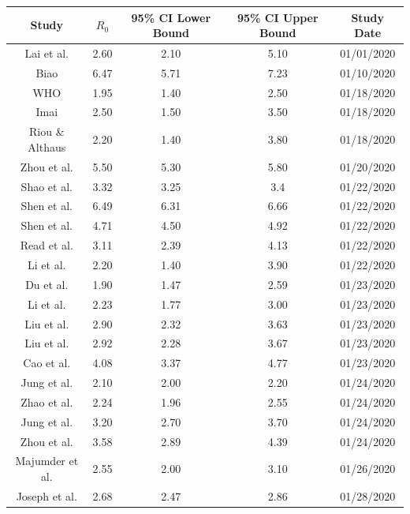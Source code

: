 \documentclass{article}
\begin{document}
\begin{center}
\begin{tabular}{|c|c|c|c|c|} 
\hline
Study & $R_0$ & 95\% CI Lower Bound & 95\% CI Upper Bound & Study Date\\ \hline
Lai et al. \cite{Lai} & 2.60 & 2.10 & 5.10 & 01/01/2020 \\ \hline
Biao \cite{Biao} & 6.47 & 5.71 & 7.23 & 01/10/2020 \\ \hline
WHO \cite{WHO} & 1.95 & 1.40 & 2.50 & 01/18/2020 \\ \hline
Imai \cite{Imai} & 2.50 & 1.50 & 3.50 & 01/18/2020 \\ \hline
Riou \& Althaus \cite{Riou} & 2.20 & 1.40 & 3.80 & 01/18/2020 \\ \hline
Zhou et al. \cite{Zhou2} & 5.50 & 5.30 & 5.80 & 01/20/2020 \\ \hline
Shao et al. \cite{Shao} & 3.32 & 3.25 & 3.4 & 01/22/2020 \\ \hline
Shen et al. \cite{Shen} & 6.49 & 6.31 & 6.66 & 01/22/2020 \\ \hline
Shen et al. \cite{Shen} & 4.71 & 4.50 & 4.92 & 01/22/2020 \\ \hline
Read et al. \cite{Read} & 3.11 & 2.39 & 4.13 & 01/22/2020 \\ \hline
Li et al. \cite{Li} & 2.20 & 1.40 & 3.90 & 01/22/2020 \\ \hline
Du et al. \cite{Du} & 1.90 & 1.47 & 2.59 & 01/23/2020 \\ \hline
Li et al. \cite{Li2} & 2.23 & 1.77 & 3.00 & 01/23/2020 \\ \hline
Liu et al. \cite{Liu} & 2.90 & 2.32 & 3.63 & 01/23/2020 \\ \hline
Liu et al. \cite{Liu} & 2.92 & 2.28 & 3.67 & 01/23/2020 \\ \hline
Cao et al. \cite{Cao} & 4.08 & 3.37 & 4.77 & 01/23/2020 \\ \hline
Jung et al. \cite{Jung} & 2.10 & 2.00 & 2.20 & 01/24/2020 \\ \hline
Zhao et al. \cite{Zhao} & 2.24 & 1.96 & 2.55 & 01/24/2020 \\ \hline
Jung et al. \cite{Jung} & 3.20 & 2.70 & 3.70 & 01/24/2020 \\ \hline
Zhou et al. \cite{Zhou} & 3.58 & 2.89 & 4.39 & 01/24/2020 \\ \hline
Majumder et al. \cite{Majumder} & 2.55 & 2.00 & 3.10 & 01/26/2020 \\ \hline
Joseph et al. \cite{Joseph} & 2.68 & 2.47 & 2.86 & 01/28/2020 \\ \hline

\end{tabular}
\end{center}
\end{document}

